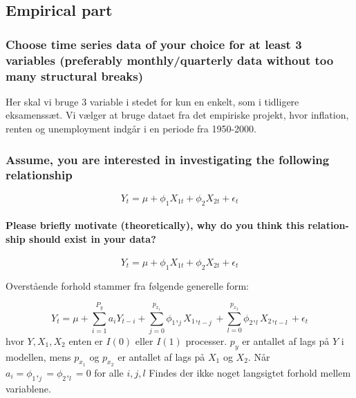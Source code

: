 \documentclass[
  10pt,
]{article}
\begin{document}
\hypertarget{empirical-part}{%
\subsection{Empirical part}\label{empirical-part}}

\hypertarget{choose-time-series-data-of-your-choice-for-at-least-3-variables-preferably-monthlyquarterly-data-without-too-many-structural-breaks}{%
\subsubsection{Choose time series data of your choice for at least 3
variables (preferably monthly/quarterly data without too many structural
breaks)}\label{choose-time-series-data-of-your-choice-for-at-least-3-variables-preferably-monthlyquarterly-data-without-too-many-structural-breaks}}

Her skal vi bruge 3 variable i stedet for kun en enkelt, som i tidligere
eksamenssæt. Vi vælger at bruge dataet fra det empiriske projekt, hvor
inflation, renten og unemployment indgår i en periode fra 1950-2000.

\hypertarget{assume-you-are-interested-in-investigating-the-following-relationship}{%
\subsubsection{Assume, you are interested in investigating the following
relationship}\label{assume-you-are-interested-in-investigating-the-following-relationship}}

\[ Y_t=\mu+\phi_1X_{1t}+\phi_2X_{2t}+\epsilon_t    \]

\hypertarget{please-briefly-motivate-theoretically-why-do-you-think-this-relation-ship-should-exist-in-your-data}{%
\paragraph{Please briefly motivate (theoretically), why do you think
this relation-ship should exist in your
data?}\label{please-briefly-motivate-theoretically-why-do-you-think-this-relation-ship-should-exist-in-your-data}}

\[ Y_t=\mu+\phi_1X_{1t}+\phi_2X_{2t}+\epsilon_t    \]

Overstående forhold stammer fra følgende generelle form:

\[ Y_t=\mu+\sum_{i=1}^{P_y}a_iY_{t-i}+ \sum_{j=0}^{p_{x_1}} \phi_1,_jX_1,_{t-j}+\sum_{l=0}^{p_{x_2}}\phi_2,_lX_2,_{t-l}+\epsilon_t \]
hvor \({Y,X_1,X_2}\) enten er \(I(0)\) eller \(I(1)\) processer. \(p_y\)
er antallet af lags på \(Y\) i modellen, mens \(p_{x_1}\) og \(p_{x_2}\)
er antallet af lags på \(X_1\) og \(X_2\). Når
\(a_i=\phi_1,_j=\phi_2,_l=0\) for alle \(i,j,l\) Findes der ikke noget
langsigtet forhold mellem variablene.
\end{document}
